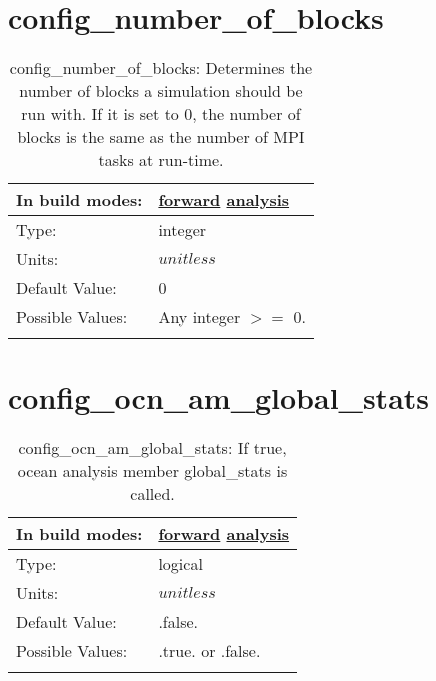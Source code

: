 \section[config\_number\_of\_blocks]{config\_number\_of\_blocks}
\label{sec:nm_sec_config_number_of_blocks}
\begin{center}
\begin{longtable}{| p{2.0in} || p{4.0in} |}
    \hline
    In build modes: & \hyperref[subsec:forward_nm_tab_decomposition]{forward} \hyperref[subsec:analysis_nm_tab_decomposition]{analysis} \\
    \hline
    Type: & integer \\
    \hline
    Units: & $unitless$ \\
    \hline
    Default Value: & 0 \\
    \hline
    Possible Values: & Any integer $>=$ 0. \\
    \hline
    \caption{config\_number\_of\_blocks: Determines the number of blocks a simulation should be run with. If it is set to 0, the number of blocks is the same as the number of MPI tasks at run-time.}
\end{longtable}
\end{center}
\section[config\_ocn\_am\_global\_stats]{config\_ocn\_am\_global\_stats}
\label{sec:nm_sec_config_ocn_am_global_stats}
\begin{center}
\begin{longtable}{| p{2.0in} || p{4.0in} |}
    \hline
    In build modes: & \hyperref[subsec:forward_nm_tab_ocn_am_global_stats]{forward} \hyperref[subsec:analysis_nm_tab_ocn_am_global_stats]{analysis} \\
    \hline
    Type: & logical \\
    \hline
    Units: & $unitless$ \\
    \hline
    Default Value: & .false. \\
    \hline
    Possible Values: & .true. or .false. \\
    \hline
    \caption{config\_ocn\_am\_global\_stats: If true, ocean analysis member global\_stats is called.}
\end{longtable}
\end{center}
